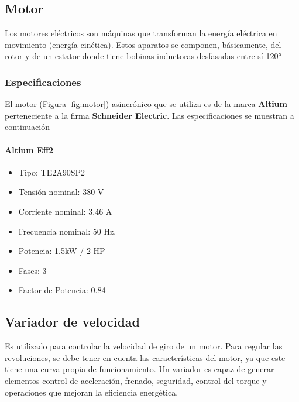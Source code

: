 \subsection{Motor}
\begin{tcolorbox}[colback=blue!5!white,colframe=blue!75!black,title=Motor eléctrico]
	Los motores eléctricos son máquinas que transforman la energía eléctrica en movimiento (energía cinética). Estos aparatos se componen, básicamente, del rotor y de un estator donde tiene bobinas inductoras desfasadas entre sí 120°
\end{tcolorbox}

\subsubsection{Especificaciones}
El motor (Figura \ref{fig:motor}) asincrónico que se utiliza es de la marca \textbf{Altium} perteneciente a la firma \textbf{Schneider Electric}. Las especificaciones se muestran a continuación \\
\paragraph*{Altium Eff2}

\begin{minipage}[t]{.5\textwidth}
	\begin{itemize}
		\item Tipo: TE2A90SP2
		\item Tensión nominal: 380 V
		\item Corriente nominal: 3.46 A
		\item Frecuencia nominal:  50 Hz.
		\item Potencia: 1.5kW / 2 HP
		\item Fases: 3
		\item Factor de Potencia: 0.84
	\end{itemize}
\end{minipage}
\begin{minipage}[t]{.5\textwidth}
	\centering{}
	\label{fig:motor}

\end{minipage}

\subsection{Variador de velocidad}
\begin{tcolorbox}[colback=blue!5!white,colframe=blue!75!black,title=Variador de velocidad]
	Es utilizado para controlar la velocidad de giro de un motor.
	Para regular las revoluciones, se debe tener en cuenta las características del motor, ya que este tiene una curva propia de funcionamiento. Un variador es capaz de generar elementos control de aceleración, frenado, seguridad, control del torque y operaciones que mejoran la eficiencia energética.
\end{tcolorbox}

